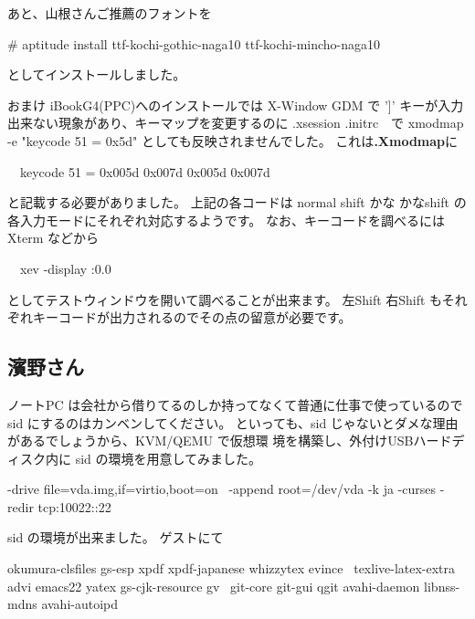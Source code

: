 \documentclass[mingoth,a4paper]{jsarticle}
\begin{document}
あと、山根さんご推薦のフォントを
\begin{commandline}
  # aptitude install ttf-kochi-gothic-naga10 ttf-kochi-mincho-naga10
\end{commandline}
としてインストールしました。

おまけ
iBookG4(PPC)へのインストールでは X-Window GDM で ']' キーが入力出来ない現象があり、キーマップを変更するのに
.xsession .initrc　で xmodmap -e "keycode 51 = 0x5d" としても反映されませんでした。
これは{\bf .Xmodmap}に
\begin{commandline}
　keycode 51 = 0x005d 0x007d 0x005d 0x007d
\end{commandline}
と記載する必要がありました。
上記の各コードは normal shift かな かなshift の各入力モードにそれぞれ対応するようです。
なお、キーコードを調べるには Xterm などから
\begin{commandline}
　xev -display :0.0
\end{commandline}
としてテストウィンドウを開いて調べることが出来ます。
左Shift 右Shift もそれぞれキーコードが出力されるのでその点の留意が必要です。

\subsection{濱野さん}

ノートPC は会社から借りてるのしか持ってなくて普通に仕事で使っているので
sid にするのはカンベンしてください。
といっても、sid じゃないとダメな理由があるでしょうから、KVM/QEMU で仮想環
境を構築し、外付けUSBハードディスク内に sid の環境を用意してみました。

\begin{commandline}

   -drive file=vda.img,if=virtio,boot=on \
   -append root=/dev/vda -k ja -curses -redir tcp:10022::22
\end{commandline}

sid の環境が出来ました。
ゲストにて
\begin{commandline}
   okumura-clsfiles gs-esp xpdf xpdf-japanese whizzytex evince \
   texlive-latex-extra advi emacs22 yatex gs-cjk-resource gv \
   git-core git-gui qgit avahi-daemon libnss-mdns avahi-autoipd
\end{commandline}
\end{document}
